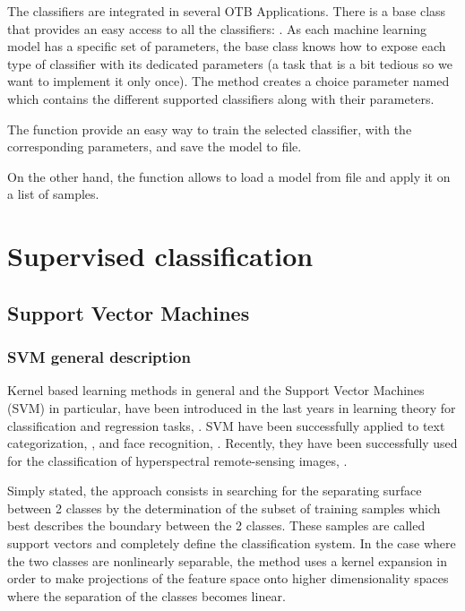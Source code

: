The classifiers are integrated in several OTB Applications. There is a base
class that provides an easy access to all the classifiers:
. As each machine learning
model has a specific set of parameters, the base class
 knows how to expose each type of classifier with
its dedicated parameters (a task that is a bit tedious so we want to implement
it only once). The  method creates a choice parameter named
 which contains the different supported classifiers along
with their parameters.

The function  provide an easy way to train the selected
classifier, with the corresponding parameters, and save the model to file.

On the other hand, the function  allows to load a model
from file and apply it on a list of samples.

\section{Supervised classification}

\subsection{Support Vector Machines}
\label{sec:SupportVectorMachines}

\subsubsection{SVM general description}
Kernel based learning methods in general and the Support Vector
Machines (SVM) in particular, have been introduced in the last years
in learning theory for classification and regression tasks,
\cite{vapnik}. SVM have been successfully applied to text
categorization, \cite{joachims}, and face recognition,
\cite{osuna}. Recently, they have been successfully used for the
classification of hyperspectral remote-sensing images, \cite{bruzzoneSVM}.

Simply stated, the approach consists in searching for the separating
surface between 2 classes by the determination of the subset of
training samples which best describes the boundary between the 2
classes. These samples are called support vectors and completely
define the classification system. In the case where the two classes are
nonlinearly separable, the method uses a kernel expansion in order to make
projections of the feature space onto higher dimensionality spaces
where the separation of the classes becomes linear.



